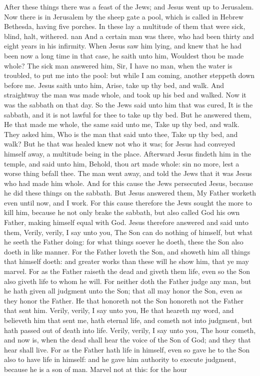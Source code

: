 After these things there was a feast of the Jews; and Jesus went up to Jerusalem.  Now there is in Jerusalem by the sheep gate a pool, which is called in Hebrew Bethesda, having five porches. In these lay a multitude of them that were sick, blind, halt, withered. nan And a certain man was there, who had been thirty and eight years in his infirmity. When Jesus saw him lying, and knew that he had been now a long time in that case, he saith unto him, Wouldest thou be made whole? The sick man answered him, Sir, I have no man, when the water is troubled, to put me into the pool: but while I am coming, another steppeth down before me. Jesus saith unto him, Arise, take up thy bed, and walk. And straightway the man was made whole, and took up his bed and walked. Now it was the sabbath on that day. So the Jews said unto him that was cured, It is the sabbath, and it is not lawful for thee to take up thy bed. But he answered them, He that made me whole, the same said unto me, Take up thy bed, and walk. They asked him, Who is the man that said unto thee, Take up thy bed, and walk? But he that was healed knew not who it was; for Jesus had conveyed himself away, a multitude being in the place. Afterward Jesus findeth him in the temple, and said unto him, Behold, thou art made whole: sin no more, lest a worse thing befall thee. The man went away, and told the Jews that it was Jesus who had made him whole. And for this cause the Jews persecuted Jesus, because he did these things on the sabbath. But Jesus answered them, My Father worketh even until now, and I work. For this cause therefore the Jews sought the more to kill him, because he not only brake the sabbath, but also called God his own Father, making himself equal with God.  Jesus therefore answered and said unto them, Verily, verily, I say unto you, The Son can do nothing of himself, but what he seeth the Father doing: for what things soever he doeth, these the Son also doeth in like manner. For the Father loveth the Son, and showeth him all things that himself doeth: and greater works than these will he show him, that ye may marvel. For as the Father raiseth the dead and giveth them life, even so the Son also giveth life to whom he will. For neither doth the Father judge any man, but he hath given all judgment unto the Son; that all may honor the Son, even as they honor the Father. He that honoreth not the Son honoreth not the Father that sent him. Verily, verily, I say unto you, He that heareth my word, and believeth him that sent me, hath eternal life, and cometh not into judgment, but hath passed out of death into life. Verily, verily, I say unto you, The hour cometh, and now is, when the dead shall hear the voice of the Son of God; and they that hear shall live. For as the Father hath life in himself, even so gave he to the Son also to have life in himself: and he gave him authority to execute judgment, because he is a son of man. Marvel not at this: for the hour 